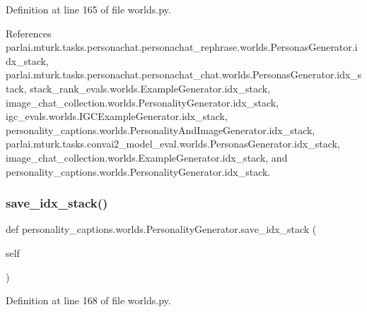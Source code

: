 Definition at line 165 of file worlds.\+py.



References parlai.\+mturk.\+tasks.\+personachat.\+personachat\+\_\+rephrase.\+worlds.\+Personas\+Generator.\+idx\+\_\+stack, parlai.\+mturk.\+tasks.\+personachat.\+personachat\+\_\+chat.\+worlds.\+Personas\+Generator.\+idx\+\_\+stack, stack\+\_\+rank\+\_\+evals.\+worlds.\+Example\+Generator.\+idx\+\_\+stack, image\+\_\+chat\+\_\+collection.\+worlds.\+Personality\+Generator.\+idx\+\_\+stack, igc\+\_\+evals.\+worlds.\+I\+G\+C\+Example\+Generator.\+idx\+\_\+stack, personality\+\_\+captions.\+worlds.\+Personality\+And\+Image\+Generator.\+idx\+\_\+stack, parlai.\+mturk.\+tasks.\+convai2\+\_\+model\+\_\+eval.\+worlds.\+Personas\+Generator.\+idx\+\_\+stack, image\+\_\+chat\+\_\+collection.\+worlds.\+Example\+Generator.\+idx\+\_\+stack, and personality\+\_\+captions.\+worlds.\+Personality\+Generator.\+idx\+\_\+stack.

\mbox{\label{classpersonality__captions_1_1worlds_1_1PersonalityGenerator_a6234b41cdaf670fa367723cce5a47b8b}} 
\subsubsection{\texorpdfstring{save\+\_\+idx\+\_\+stack()}{save\_idx\_stack()}}
{\footnotesize\ttfamily def personality\+\_\+captions.\+worlds.\+Personality\+Generator.\+save\+\_\+idx\+\_\+stack (\begin{DoxyParamCaption}\item[{}]{self }\end{DoxyParamCaption})}



Definition at line 168 of file worlds.\+py.



